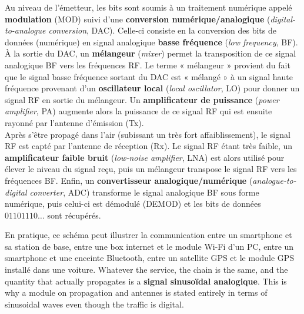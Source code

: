 Au niveau de l'émetteur, les bits sont soumis à un traitement numérique appelé
\textbf{modulation} (MOD) suivi d'une \textbf{conversion numérique/analogique}
(\textit{digital-to-analogue conversion}, DAC). Celle-ci consiste en la
conversion des bits de données (numérique) en signal analogique
\textbf{basse fréquence} (\textit{low frequency}, BF). À la sortie
du DAC, un \textbf{mélangeur} (\textit{mixer}) permet la transposition de ce
signal analogique BF vers les fréquences RF. Le terme « mélangeur » provient du
fait que le signal basse fréquence sortant du DAC est « mélangé » à un signal
haute fréquence provenant d'un \textbf{oscillateur local} (\textit{local
oscillator}, LO) pour donner un signal RF en sortie du mélangeur. Un
\textbf{amplificateur de puissance} (\textit{power amplifier}, PA) augmente alors
la puissance de ce signal RF qui est ensuite rayonné par l'antenne d'émission
(Tx).\\

Après s'être propagé dans l'air (subissant un très fort affaiblissement), le
signal RF est capté par l'antenne de réception (Rx). Le signal RF étant très
faible, un \textbf{amplificateur faible bruit} (\textit{low-noise amplifier},
LNA) est alors utilisé pour élever le niveau du signal reçu, puis un mélangeur
transpose le signal RF vers les fréquences BF. Enfin, un \textbf{convertisseur
analogique/numérique} (\textit{analogue-to-digital converter}, ADC) transforme
le signal analogique BF sous forme numérique, puis celui-ci est démodulé
(DEMOD) et les bits de données $01101110\ldots$ sont récupérés.

\begin{conclusion}
  En pratique, ce schéma peut illustrer la communication entre un smartphone et
  sa station de base, entre une box internet et le module Wi-Fi d'un PC, entre
  un smartphone et une enceinte Bluetooth, entre un satellite GPS et le module
  GPS installé dans une voiture. Whatever the service, the chain is the same,
  and the quantity that actually propagates is a \textbf{signal sinusoïdal
  analogique}. This is why a module on propagation and antennes is stated
  entirely in terms of sinusoidal waves even though the traffic is digital.
\end{conclusion}

